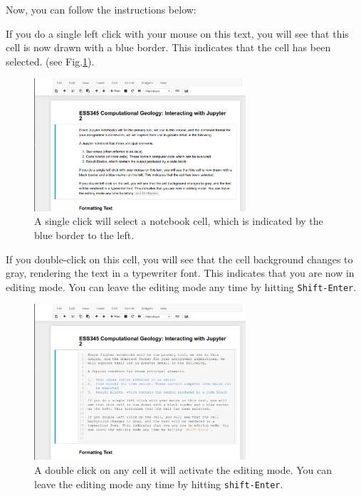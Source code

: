 \documentclass[svgnames, 11pt, lettersize]{article}
\begin{document}
Now, you can follow the instructions below:

If you do a single left click with your mouse on this text, you will
see that this cell is now drawn with a blue border. This indicates that the cell has been selected.
(see Fig.\ref{nbselected}). 

\begin{figure}[htbp]
\centering
\includegraphics[width=0.7\textwidth]{./figures/Screenshot_20200527_133749.png}
\caption{\label{nbselected}A single click will select a notebook cell, which is indicated by the blue border to the left.}
\end{figure}


If you double-click on this cell, you will see that the cell
background changes to gray, rendering the text in a
typewriter font. This indicates that you are now in editing mode. You
can leave the editing mode any time by hitting \texttt{Shift-Enter}.
\begin{figure}[htbp]
\centering
\includegraphics[width=0.7\textwidth]{./figures/Screenshot_20200527_133820.png}
\caption{\label{nbediting}A double click on any cell it will activate the editing mode. You can leave the editing mode any time by hitting \texttt{shift-Enter}.}
\end{figure}
\end{document}
